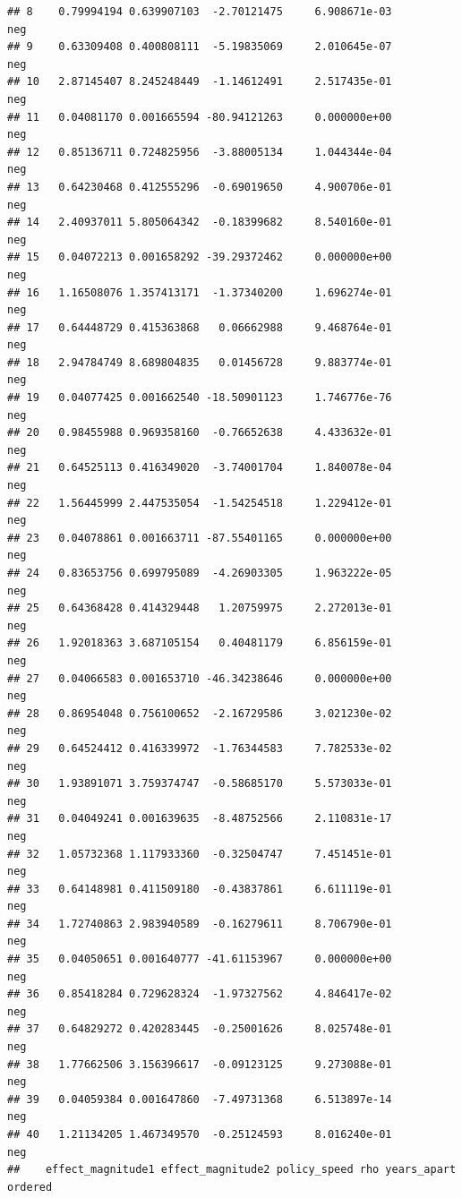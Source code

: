 \documentclass[
]{article}
\begin{document}
\begin{verbatim}
## 8    0.79994194 0.639907103  -2.70121475     6.908671e-03              neg
## 9    0.63309408 0.400808111  -5.19835069     2.010645e-07              neg
## 10   2.87145407 8.245248449  -1.14612491     2.517435e-01              neg
## 11   0.04081170 0.001665594 -80.94121263     0.000000e+00              neg
## 12   0.85136711 0.724825956  -3.88005134     1.044344e-04              neg
## 13   0.64230468 0.412555296  -0.69019650     4.900706e-01              neg
## 14   2.40937011 5.805064342  -0.18399682     8.540160e-01              neg
## 15   0.04072213 0.001658292 -39.29372462     0.000000e+00              neg
## 16   1.16508076 1.357413171  -1.37340200     1.696274e-01              neg
## 17   0.64448729 0.415363868   0.06662988     9.468764e-01              neg
## 18   2.94784749 8.689804835   0.01456728     9.883774e-01              neg
## 19   0.04077425 0.001662540 -18.50901123     1.746776e-76              neg
## 20   0.98455988 0.969358160  -0.76652638     4.433632e-01              neg
## 21   0.64525113 0.416349020  -3.74001704     1.840078e-04              neg
## 22   1.56445999 2.447535054  -1.54254518     1.229412e-01              neg
## 23   0.04078861 0.001663711 -87.55401165     0.000000e+00              neg
## 24   0.83653756 0.699795089  -4.26903305     1.963222e-05              neg
## 25   0.64368428 0.414329448   1.20759975     2.272013e-01              neg
## 26   1.92018363 3.687105154   0.40481179     6.856159e-01              neg
## 27   0.04066583 0.001653710 -46.34238646     0.000000e+00              neg
## 28   0.86954048 0.756100652  -2.16729586     3.021230e-02              neg
## 29   0.64524412 0.416339972  -1.76344583     7.782533e-02              neg
## 30   1.93891071 3.759374747  -0.58685170     5.573033e-01              neg
## 31   0.04049241 0.001639635  -8.48752566     2.110831e-17              neg
## 32   1.05732368 1.117933360  -0.32504747     7.451451e-01              neg
## 33   0.64148981 0.411509180  -0.43837861     6.611119e-01              neg
## 34   1.72740863 2.983940589  -0.16279611     8.706790e-01              neg
## 35   0.04050651 0.001640777 -41.61153967     0.000000e+00              neg
## 36   0.85418284 0.729628324  -1.97327562     4.846417e-02              neg
## 37   0.64829272 0.420283445  -0.25001626     8.025748e-01              neg
## 38   1.77662506 3.156396617  -0.09123125     9.273088e-01              neg
## 39   0.04059384 0.001647860  -7.49731368     6.513897e-14              neg
## 40   1.21134205 1.467349570  -0.25124593     8.016240e-01              neg
##    effect_magnitude1 effect_magnitude2 policy_speed rho years_apart ordered

\end{verbatim}
\end{document}
